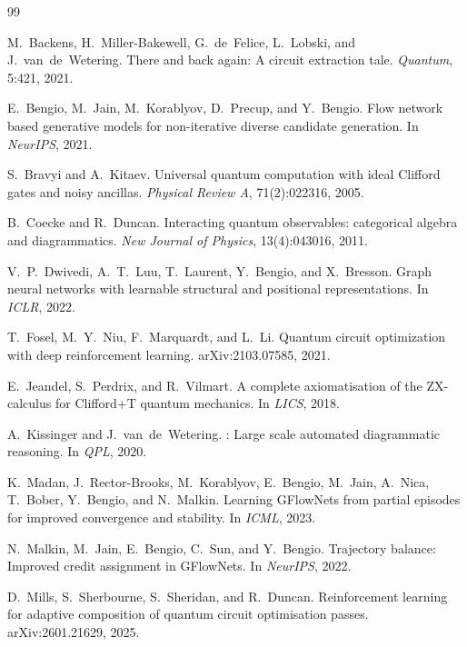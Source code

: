 \documentclass[11pt,a4paper]{article}
\begin{document}
\begin{thebibliography}{99}

M.~Backens, H.~Miller-Bakewell, G.~de~Felice, L.~Lobski, and J.~van~de~Wetering.
\newblock There and back again: A circuit extraction tale.
\newblock \emph{Quantum}, 5:421, 2021.

E.~Bengio, M.~Jain, M.~Korablyov, D.~Precup, and Y.~Bengio.
\newblock Flow network based generative models for non-iterative diverse candidate generation.
\newblock In \emph{NeurIPS}, 2021.

S.~Bravyi and A.~Kitaev.
\newblock Universal quantum computation with ideal {C}lifford gates and noisy ancillas.
\newblock \emph{Physical Review A}, 71(2):022316, 2005.

B.~Coecke and R.~Duncan.
\newblock Interacting quantum observables: categorical algebra and diagrammatics.
\newblock \emph{New Journal of Physics}, 13(4):043016, 2011.

V.~P.~Dwivedi, A.~T.~Luu, T.~Laurent, Y.~Bengio, and X.~Bresson.
\newblock Graph neural networks with learnable structural and positional representations.
\newblock In \emph{ICLR}, 2022.

T.~Fosel, M.~Y.~Niu, F.~Marquardt, and L.~Li.
\newblock Quantum circuit optimization with deep reinforcement learning.
\newblock arXiv:2103.07585, 2021.

E.~Jeandel, S.~Perdrix, and R.~Vilmart.
\newblock A complete axiomatisation of the {ZX}-calculus for {C}lifford+{T} quantum mechanics.
\newblock In \emph{LICS}, 2018.

A.~Kissinger and J.~van~de~Wetering.
: Large scale automated diagrammatic reasoning.
\newblock In \emph{QPL}, 2020.

K.~Madan, J.~Rector-Brooks, M.~Korablyov, E.~Bengio, M.~Jain, A.~Nica, T.~Bober, Y.~Bengio, and N.~Malkin.
\newblock Learning {GFlowNets} from partial episodes for improved convergence and stability.
\newblock In \emph{ICML}, 2023.

N.~Malkin, M.~Jain, E.~Bengio, C.~Sun, and Y.~Bengio.
\newblock Trajectory balance: Improved credit assignment in {GFlowNets}.
\newblock In \emph{NeurIPS}, 2022.

D.~Mills, S.~Sherbourne, S.~Sheridan, and R.~Duncan.
\newblock Reinforcement learning for adaptive composition of quantum circuit optimisation passes.
\newblock arXiv:2601.21629, 2025.


\end{thebibliography}
\end{document}
